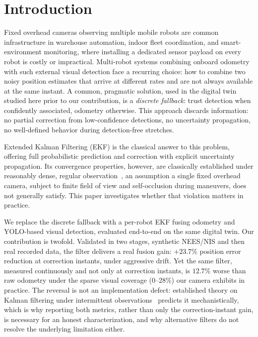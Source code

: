 \documentclass[runningheads]{llncs}
\begin{document}
\section{Introduction}

Fixed overhead cameras observing multiple mobile robots are common
infrastructure in warehouse automation, indoor fleet coordination, and
smart-environment monitoring, where installing a dedicated sensor
payload on every robot is costly or impractical. Multi-robot systems
combining onboard odometry with such external visual detection face a
recurring choice: how to combine two noisy position estimates that
arrive at different rates and are not always available at the same
instant. A common, pragmatic solution, used in the digital twin
studied here prior to our contribution, is a \emph{discrete fallback}:
trust detection when confidently associated, odometry otherwise. This
approach discards information: no partial correction from
low-confidence detections, no uncertainty propagation, no
well-defined behavior during detection-free stretches.

Extended Kalman Filtering (EKF) is the classical answer to this
problem, offering full probabilistic prediction and correction with
explicit uncertainty propagation. Its convergence properties, however,
are classically established under reasonably dense, regular
observation~\cite{dissanayake2001slam}, an assumption a single fixed
overhead camera, subject to finite field of view and self-occlusion
during maneuvers, does not generally satisfy. This paper investigates
whether that violation matters in practice.

We replace the discrete fallback with a per-robot EKF fusing odometry
and YOLO-based visual detection, evaluated end-to-end on the same
digital twin. Our contribution is twofold. Validated in two stages,
synthetic NEES/NIS and then real recorded data, the filter delivers a
real fusion gain: $+23.7\%$ position error reduction at correction
instants, under aggressive drift. Yet the same filter, measured
continuously and not only at correction instants, is $12.7\%$ worse
than raw odometry under the sparse visual coverage (0--28\%) our
camera exhibits in practice. The reversal is not an implementation
defect: established theory on Kalman filtering under intermittent
observations~\cite{sinopoli2004intermittent,censi2009geometric}
predicts it mechanistically, which is why reporting both metrics,
rather than only the correction-instant gain, is necessary for an
honest characterization, and why alternative filters do not resolve
the underlying limitation either.
\end{document}
